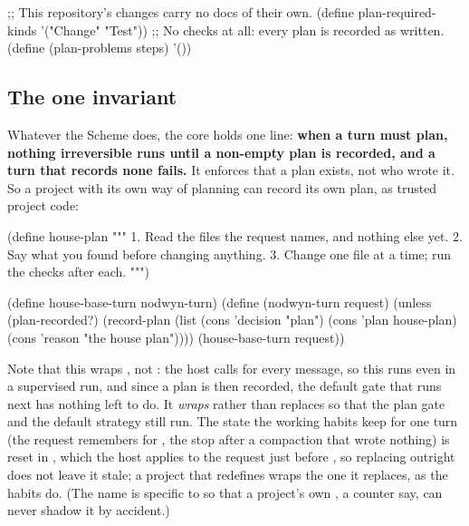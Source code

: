 \begin{scm}
;; This repository's changes carry no docs of their own.
(define plan-required-kinds '("Change" "Test"))
;; No checks at all: every plan is recorded as written.
(define (plan-problems steps) '())
\end{scm}

\subsection{The one invariant}

Whatever the Scheme does, the core holds one line: \textbf{when a turn
must plan, nothing irreversible runs until a non-empty plan is recorded,
and a turn that records none fails.} It enforces that a plan exists, not
who wrote it. So a project with its own way of planning can record its own
plan, as trusted project code:

\begin{scm}
(define house-plan
  """
  1. Read the files the request names, and nothing else yet.
  2. Say what you found before changing anything.
  3. Change one file at a time; run the checks after each.
  """)

(define house-base-turn nodwyn-turn)
(define (nodwyn-turn request)
  (unless (plan-recorded?)
    (record-plan (list (cons 'decision "plan") (cons 'plan house-plan)
                       (cons 'reason "the house plan"))))
  (house-base-turn request))
\end{scm}

\begin{txt}
    3 gate.plan       {Origin:gate Noul:plan Plan:1. Read the files the request names ...
\end{txt}

Note that this wraps , not : the host
calls  for every message, so this runs even in a
supervised run, and since a plan is then recorded, the default gate that
runs next has nothing left to do. It \emph{wraps} rather than replaces so
that the plan gate and the default strategy still run. The state the working
habits keep for one turn (the request  remembers for
, the stop after a compaction that wrote nothing) is reset
in , which the host applies to the request just before
, so replacing  outright does not leave
it stale; a project that redefines  wraps the one it
replaces, as the habits do. (The name is specific to \nodwyn{} so that a project's own
, a counter say, can never shadow it by accident.)

